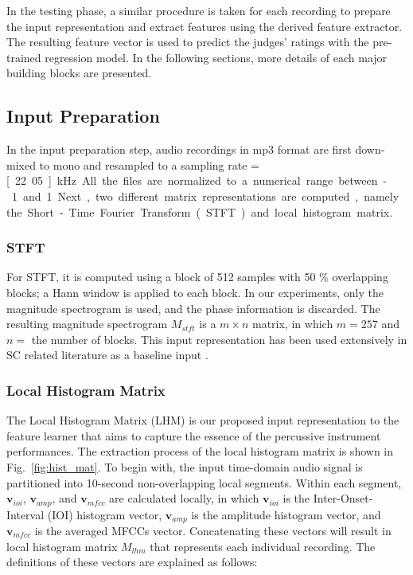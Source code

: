 \documentclass{article}
\begin{document}
In the testing phase, a similar procedure is taken for each recording to prepare the input representation and extract features using the derived feature extractor. The resulting feature vector is used to predict the judges' ratings with the pre-trained regression model. In the following sections, more details of each major building blocks are presented. 

\subsection{Input Preparation}\label{subsec:input}
In the input preparation step, audio recordings in mp3 format are first down-mixed to mono and resampled to a sampling rate = \unit[22.05]{kHz}. All the files are normalized to a numerical range between -1 and 1. Next, two different matrix representations are computed, namely the Short-Time Fourier Transform (STFT) and local histogram matrix. 

\subsubsection{STFT}\label{subsec:stft}
For STFT, it is computed using a block of 512 samples with 50 \% overlapping blocks; a Hann window is applied to each block. In our experiments, only the magnitude spectrogram is used, and the phase information is discarded. The resulting magnitude spectrogram $M_{stft}$ is a $m \times n$ matrix, in which $m = 257$ and $n = $ the number of blocks. This input representation has been used extensively in SC related literature as a baseline input \cite{Su2014Guitar, Su2014Violin}. 

\subsubsection{Local Histogram Matrix}
The Local Histogram Matrix (LHM) is our proposed input representation to the feature learner that aims to capture the essence of the percussive instrument performances. The extraction process of the local histogram matrix is shown in Fig.~\ref{fig:hist_mat}. To begin with, the input time-domain audio signal is partitioned into 10-second non-overlapping local segments. Within each segment, $\mathbf{v}_{ioi}$, $\mathbf{v}_{amp}$, and $\mathbf{v}_{mfcc}$ are calculated locally, in which $\mathbf{v}_{ioi}$ is the Inter-Onset-Interval (IOI) histogram vector, $\mathbf{v}_{amp}$ is the amplitude histogram vector, and $\mathbf{v}_{mfcc}$ is the averaged MFCCs vector. Concatenating these vectors will result in local histogram matrix $M_{lhm}$ that represents each individual recording. The definitions of these vectors are explained as follows:
\end{document}
